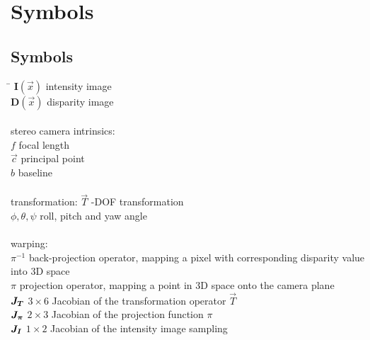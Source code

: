 \chapter*{Symbols}
\label{sec:symbols}

\section*{Symbols}

\begin{tabbing}
 \hspace*{1.6cm} \= \kill
 $\mathbf{I}(\vec{x})$          \> intensity image \\[0.5ex]
 $\mathbf{D}(\vec{x})$          \> disparity image \\[0.5ex]
 \\
 stereo camera intrinsics: \\
 $f$                            \> focal length \\[0.5ex]
 $\vec{c}$                      \> principal point \\[0.5ex]
 $b$                            \> baseline \\[0.5ex]
 \\
 transformation:
 $\vec{T}$                      -DOF transformation \\[0.5ex]
 $\phi, \theta, \psi$           \> roll, pitch and yaw angle \\[0.5ex]
 \\
 warping: \\
 $\pi^{-1}$                     \> back-projection operator, mapping a pixel with corresponding disparity value into 3D space \\[0.5ex]
 $\pi$                          \> projection operator, mapping a point in 3D space onto the camera plane \\[0.5ex]
 $\mat{J_T}$                    \> $3 \times 6$ Jacobian of the transformation operator $\vec{T}$ \\[0.5ex]
 $\mat{J_{\pi}}$                    \> $2 \times 3$ Jacobian of the projection function $\pi$ \\[0.5ex]
 $\mat{J_I}$                    \> $1 \times 2$ Jacobian of the intensity image sampling \\[0.5ex]
\end{tabbing}

